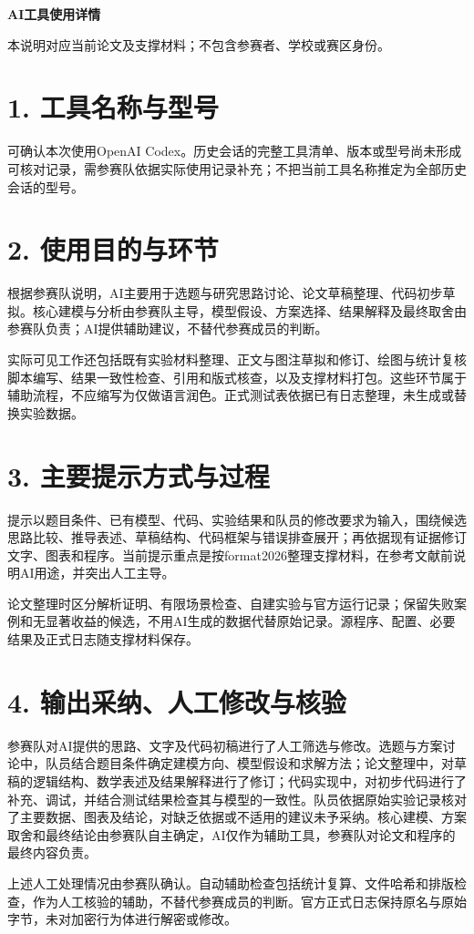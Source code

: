 \documentclass[UTF8,fontset=none,zihao=-4,a4paper]{ctexart}
\begin{document}
\begin{center}{\Large\bfseries AI工具使用详情}\end{center}
\noindent 本说明对应当前论文及支撑材料；不包含参赛者、学校或赛区身份。

\section*{1. 工具名称与型号}
可确认本次使用OpenAI Codex。历史会话的完整工具清单、版本或型号尚未形成可核对记录，需参赛队依据实际使用记录补充；不把当前工具名称推定为全部历史会话的型号。

\section*{2. 使用目的与环节}
根据参赛队说明，AI主要用于选题与研究思路讨论、论文草稿整理、代码初步草拟。核心建模与分析由参赛队主导，模型假设、方案选择、结果解释及最终取舍由参赛队负责；AI提供辅助建议，不替代参赛成员的判断。

实际可见工作还包括既有实验材料整理、正文与图注草拟和修订、绘图与统计复核脚本编写、结果一致性检查、引用和版式核查，以及支撑材料打包。这些环节属于辅助流程，不应缩写为仅做语言润色。正式测试表依据已有日志整理，未生成或替换实验数据。

\section*{3. 主要提示方式与过程}
提示以题目条件、已有模型、代码、实验结果和队员的修改要求为输入，围绕候选思路比较、推导表述、草稿结构、代码框架与错误排查展开；再依据现有证据修订文字、图表和程序。当前提示重点是按format2026整理支撑材料，在参考文献前说明AI用途，并突出人工主导。

论文整理时区分解析证明、有限场景检查、自建实验与官方运行记录；保留失败案例和无显著收益的候选，不用AI生成的数据代替原始记录。源程序、配置、必要结果及正式日志随支撑材料保存。

\section*{4. 输出采纳、人工修改与核验}
参赛队对AI提供的思路、文字及代码初稿进行了人工筛选与修改。选题与方案讨论中，队员结合题目条件确定建模方向、模型假设和求解方法；论文整理中，对草稿的逻辑结构、数学表述及结果解释进行了修订；代码实现中，对初步代码进行了补充、调试，并结合测试结果检查其与模型的一致性。队员依据原始实验记录核对了主要数据、图表及结论，对缺乏依据或不适用的建议未予采纳。核心建模、方案取舍和最终结论由参赛队自主确定，AI仅作为辅助工具，参赛队对论文和程序的最终内容负责。

上述人工处理情况由参赛队确认。自动辅助检查包括统计复算、文件哈希和排版检查，作为人工核验的辅助，不替代参赛成员的判断。官方正式日志保持原名与原始字节，未对加密行为体进行解密或修改。
\end{document}
